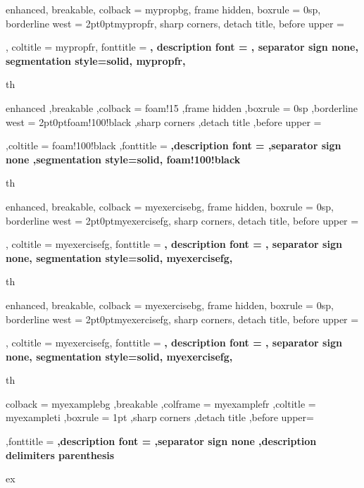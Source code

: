 {%
	enhanced,
	breakable,
	colback = mypropbg,
	frame hidden,
	boxrule = 0sp,
	borderline west = {2pt}{0pt}{mypropfr},
	sharp corners,
	detach title,
	before upper = \tcbtitle\par\smallskip,
	coltitle = mypropfr,
	fonttitle = \bfseries\sffamily,
	description font = \mdseries,
	separator sign none,
	segmentation style={solid, mypropfr},
}
{th}



{%
	enhanced
	,breakable
	,colback = foam!15
	,frame hidden
	,boxrule = 0sp
	,borderline west = {2pt}{0pt}{foam!100!black}
	,sharp corners
	,detach title
	,before upper = \tcbtitle\par\smallskip
	,coltitle = foam!100!black
	,fonttitle = \bfseries\sffamily
	,description font = \mdseries
	,separator sign none
	,segmentation style={solid, foam!100!black}
}
{th}




{%
	enhanced,
	breakable,
	colback = myexercisebg,
	frame hidden,
	boxrule = 0sp,
	borderline west = {2pt}{0pt}{myexercisefg},
	sharp corners,
	detach title,
	before upper = \tcbtitle\par\smallskip,
	coltitle = myexercisefg,
	fonttitle = \bfseries\sffamily,
	description font = \mdseries,
	separator sign none,
	segmentation style={solid, myexercisefg},
}
{th}

{%
	enhanced,
	breakable,
	colback = myexercisebg,
	frame hidden,
	boxrule = 0sp,
	borderline west = {2pt}{0pt}{myexercisefg},
	sharp corners,
	detach title,
	before upper = \tcbtitle\par\smallskip,
	coltitle = myexercisefg,
	fonttitle = \bfseries\sffamily,
	description font = \mdseries,
	separator sign none,
	segmentation style={solid, myexercisefg},
}
{th}


{%
	colback = myexamplebg
	,breakable
	,colframe = myexamplefr
	,coltitle = myexampleti
	,boxrule = 1pt
	,sharp corners
	,detach title
	,before upper=\tcbtitle\par\smallskip
	,fonttitle = \bfseries
	,description font = \mdseries
	,separator sign none
	,description delimiters parenthesis
}
{ex}

